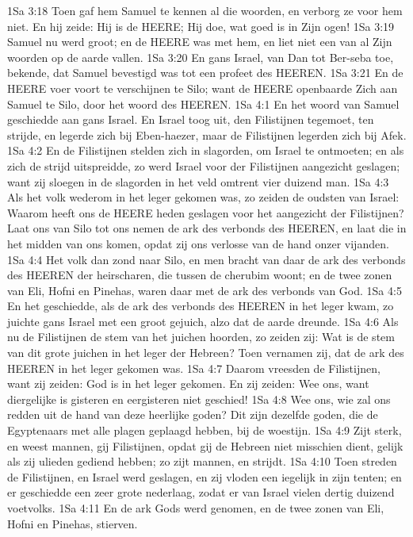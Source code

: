 1Sa 3:18  Toen gaf hem Samuel te kennen al die woorden, en verborg ze voor hem niet. En hij zeide: Hij is de HEERE; Hij doe, wat goed is in Zijn ogen!
1Sa 3:19  Samuel nu werd groot; en de HEERE was met hem, en liet niet een van al Zijn woorden op de aarde vallen.
1Sa 3:20  En gans Israel, van Dan tot Ber-seba toe, bekende, dat Samuel bevestigd was tot een profeet des HEEREN.
1Sa 3:21  En de HEERE voer voort te verschijnen te Silo; want de HEERE openbaarde Zich aan Samuel te Silo, door het woord des HEEREN.
1Sa 4:1  En het woord van Samuel geschiedde aan gans Israel. En Israel toog uit, den Filistijnen tegemoet, ten strijde, en legerde zich bij Eben-haezer, maar de Filistijnen legerden zich bij Afek.
1Sa 4:2  En de Filistijnen stelden zich in slagorden, om Israel te ontmoeten; en als zich de strijd uitspreidde, zo werd Israel voor der Filistijnen aangezicht geslagen; want zij sloegen in de slagorden in het veld omtrent vier duizend man.
1Sa 4:3  Als het volk wederom in het leger gekomen was, zo zeiden de oudsten van Israel: Waarom heeft ons de HEERE heden geslagen voor het aangezicht der Filistijnen? Laat ons van Silo tot ons nemen de ark des verbonds des HEEREN, en laat die in het midden van ons komen, opdat zij ons verlosse van de hand onzer vijanden.
1Sa 4:4  Het volk dan zond naar Silo, en men bracht van daar de ark des verbonds des HEEREN der heirscharen, die tussen de cherubim woont; en de twee zonen van Eli, Hofni en Pinehas, waren daar met de ark des verbonds van God.
1Sa 4:5  En het geschiedde, als de ark des verbonds des HEEREN in het leger kwam, zo juichte gans Israel met een groot gejuich, alzo dat de aarde dreunde.
1Sa 4:6  Als nu de Filistijnen de stem van het juichen hoorden, zo zeiden zij: Wat is de stem van dit grote juichen in het leger der Hebreen? Toen vernamen zij, dat de ark des HEEREN in het leger gekomen was.
1Sa 4:7  Daarom vreesden de Filistijnen, want zij zeiden: God is in het leger gekomen. En zij zeiden: Wee ons, want diergelijke is gisteren en eergisteren niet geschied!
1Sa 4:8  Wee ons, wie zal ons redden uit de hand van deze heerlijke goden? Dit zijn dezelfde goden, die de Egyptenaars met alle plagen geplaagd hebben, bij de woestijn.
1Sa 4:9  Zijt sterk, en weest mannen, gij Filistijnen, opdat gij de Hebreen niet misschien dient, gelijk als zij ulieden gediend hebben; zo zijt mannen, en strijdt.
1Sa 4:10  Toen streden de Filistijnen, en Israel werd geslagen, en zij vloden een iegelijk in zijn tenten; en er geschiedde een zeer grote nederlaag, zodat er van Israel vielen dertig duizend voetvolks.
1Sa 4:11  En de ark Gods werd genomen, en de twee zonen van Eli, Hofni en Pinehas, stierven.

